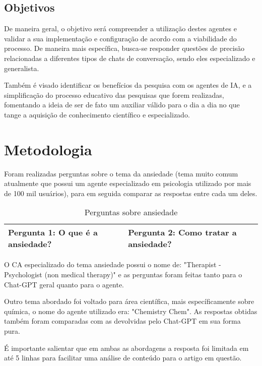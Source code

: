 \documentclass{article}
\begin{document}
\subsection{Objetivos}

\hspace{0.5cm}De maneira geral, o objetivo será compreender a utilização destes agentes e validar a sua implementação e configuração de acordo com a viabilidade do processo. De maneira mais específica, busca-se responder questões de precisão relacionadas a diferentes tipos de chats de conversação, sendo eles especializado e generalista.

Também é visado identificar os benefícios da pesquisa com os agentes de IA, e a simplificação do processo educativo das pesquisas que forem realizadas, fomentando a ideia de ser de fato um auxiliar válido para o dia a dia no que tange a aquisição de conhecimento científico e especializado.

\section{Metodologia}

\hspace{0.5cm}Foram realizadas perguntas sobre o tema da ansiedade (tema muito comum atualmente que possui um agente especializado em psicologia utilizado por mais de 100 mil usuários), para em seguida comparar as respostas entre cada um deles.

\begin{table}[h]
    \centering
    \begin{tabular}{|p{6cm}|p{6cm}|}
    \hline
    \textbf{Pergunta 1:} O que é a ansiedade? &
    \textbf{Pergunta 2:} Como tratar a ansiedade? \\
    \hline
   
    \end{tabular}
    \caption{Perguntas sobre ansiedade}
    \label{tab:ansiedade}
\end{table}

O CA especializado do tema ansiedade possui o nome de: "Therapist - Psychologist (non medical therapy)" e as perguntas foram feitas tanto para o Chat-GPT geral quanto para o agente.

Outro tema abordado foi voltado para área científica, mais específicamente sobre química, o nome do agente utilizado era: "Chemistry Chem". As respostas obtidas também foram comparadas com as devolvidas pelo Chat-GPT em sua forma pura. 

É importante salientar que em ambas as abordagens a resposta foi limitada em até 5 linhas para facilitar uma análise de conteúdo para o artigo em questão.
\end{document}
